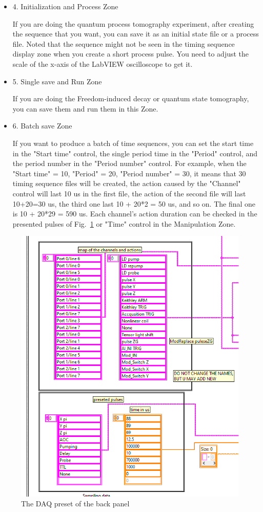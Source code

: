 \documentclass{article}
\begin{document}
\begin{itemize}
    \item 4. Initialization and Process Zone

    If you are doing the quantum process tomography experiment, after creating the sequence that you want, you can save it as an initial state file or a process file. Noted that the sequence might not be seen in the timing sequence display zone when you create a short process pulse. You need to adjust the scale of the x-axis of the LabVIEW oscilloscope to get it. 
    
    \item 5. Single save and Run Zone

    If you are doing the Freedom-induced decay or quantum state tomography, you can save them and run them in this Zone.
    
    \item 6. Batch save Zone

    If you want to produce a batch of time sequences, you can set the start time in the "Start time" control, the single period time in the "Period" control, and the period number in the "Period number" control. For example, when the "Start time" = 10, "Period" = 20, "Period number" = 30, it means that 30 timing sequence files will be created, the action caused by the "Channel" control will last  10 us in the first file, the action of the second file will last 10+20=30 us, the third one last 10 + 20*2 = 50 us, and so on. The final one is  10 + 20*29 = 590 us. Each channel's action duration can be checked in the presented pulses of Fig.~\ref{fig:DAQ-preset} or "Time" control in the Manipulation Zone.
\end{itemize}

\begin{figure}[htbp]
    \centering
    \includegraphics[width=0.8\linewidth]{fig/DAQ_Preset.png}
    \caption{The DAQ preset of the back panel}
    \label{fig:DAQ-preset}
\end{figure}
\end{document}

